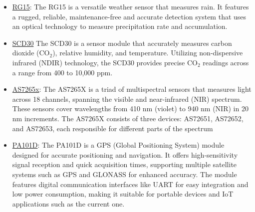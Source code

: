 \documentclass[12pt]{article}
\begin{document}
\begin{itemize}
\begin{itemize}
        \item \href{https://rainsensors.com/products/rg-15/}{RG15}: The RG15 is a versatile weather sensor that measures rain. It features a rugged, reliable, maintenance-free and accurate detection system that uses an optical technology to measure precipitation rate and accumulation.
        
        \item \href{https://sensirion.com/media/documents/4EAF6AF8/61652C3C/Sensirion_CO2_Sensors_SCD30_Datasheet.pdf}{SCD30} The SCD30 is a sensor module that accurately measures carbon dioxide (CO$_2$), relative humidity, and temperature. Utilizing non-dispersive infrared (NDIR) technology, the SCD30 provides precise CO$_2$ readings across a range from 400 to 10,000 ppm. 
        \item \href{https://cdn.sparkfun.com/assets/c/2/9/0/a/AS7265x_Datasheet.pdf?_gl=1*nuz15w*_ga*MzMxOTM2OTQwLjE2OTAyMzE1NzI.*_ga_T369JS7J9N*MTY5MDIzMTU3MS4xLjAuMTY5MDIzMTU3MS42MC4wLjA.}{AS7265x}: The AS7265X is a triad of multispectral sensors that measures light across 18 channels, spanning the visible and near-infrared (NIR) spectrum. These sensors cover wavelengths from 410 nm (violet) to 940 nm (NIR) in 20 nm increments. The AS7265X consists of three devices: AS72651, AS72652, and AS72653, each responsible for different parts of the spectrum
        \item \href{https://cdn-learn.adafruit.com/downloads/pdf/adafruit-mini-gps-pa1010d-module.pdf}{PA101D}: 
        The PA101D is a GPS (Global Positioning System)  module designed for accurate positioning and navigation. It offers high-sensitivity signal reception and quick acquisition times, supporting multiple satellite systems such as GPS and GLONASS for enhanced accuracy. The module features digital communication interfaces like UART for easy integration and low power consumption, making it suitable for portable devices and IoT applications such as the current one.
        \end{itemize}        
\end{itemize}


\end{document}
